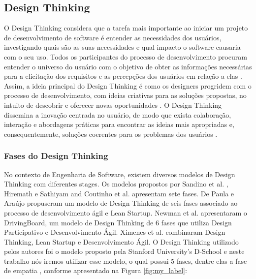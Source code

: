 \documentclass[conference]{IEEEtran}
\begin{document}
\subsection{Design Thinking}

O Design Thinking considera que a tarefa mais importante ao iniciar um projeto de desenvolvimento de software é entender as necessidades dos usuários, investigando quais são as suas necessidades e qual impacto o software causaria com o seu uso. Todos os participantes do processo de desenvolvimento procuram entender o universo do usuário com o objetivo de obter as informações necessárias para a elicitação dos requisitos e as percepções dos usuários em relação a elas \cite{DBLP:books/lib/brown2009change}. Assim, a ideia principal do Design Thinking é como os designers progridem com o processo de desenvolvimento, com ideias criativas para as soluções propostas, no intuito de descobrir e oferecer novas oportunidades \cite{DBLP:conf/hci/AdikariMC13}. O Design Thinking dissemina a inovação centrada no usuário, de modo que exista colaboração, interação e abordagens práticas para encontrar as ideias mais apropriadas e, consequentemente, soluções coerentes para os problemas dos usuários \cite{DBLP:books/lib/brown2009change}. 

\subsubsection{Fases do Design Thinking}

No contexto de Engenharia de Software, existem diversos modelos de Design Thinking com diferentes stages. Os modelos propostos por Sandino et al. \cite{DBLP:conf/hci/SandinoMV13}, Hiremath e Sathiyam \cite{DBLP:conf/interact/HiremathS13} and Coutinho et al. \cite{DBLP:conf/eatis/CoutinhoGJ16} apresentam sete fases. De Paula e Araújo \cite{DBLP:conf/hci/PaulaA16} propuseram um modelo de Design Thinking de seis fases associado ao processo de desenvolvimento ágil e Lean Startup. 
Newman et al. \cite{DBLP:conf/icse/NewmanFSFFW15} apresentaram o DrivingBoard, um modelo de Design Thinking de 6 fases que utiliza Design Participativo e Desenvolvimento Ágil. Ximenes et al.  \cite{DBLP:conf/hci/XimenesAA15} combinaram Design Thinking, Lean Startup e Desenvolvimento Ágil. O Design Thinking utilizado pelos autores foi o modelo proposto pela Stanford University’s D-School e neste trabalho nós iremos utilizar esse modelo, o qual possui 5 fases, dentre elas a fase de empatia \cite{DBLP:conf/hci/XimenesAA15}, conforme apresentado na Figura \ref{fig:my_label}: 
\end{document}
